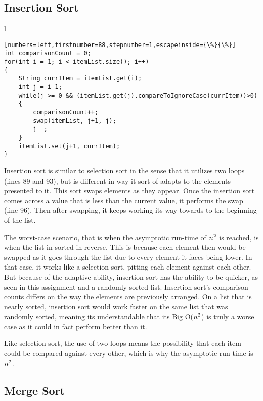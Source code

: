 \documentclass[letterpaper, 10pt,DIV=13]{scrartcl}
\numberwithin{equation}{section} %
\numberwithin{figure}{section} %
\numberwithin{table}{section} %
\begin{document}
\subsection{Insertion Sort}
\begin{center}
\begin{tabular}{l}
\begin{lstlisting}[numbers=left,firstnumber=88,stepnumber=1,escapeinside={\%}{\%}]
int comparisonCount = 0;
for(int i = 1; i < itemList.size(); i++)
{
    String currItem = itemList.get(i);
    int j = i-1;
    while(j >= 0 && (itemList.get(j).compareToIgnoreCase(currItem))>0)
    {
        comparisonCount++;
        swap(itemList, j+1, j);
        j--;
    }
    itemList.set(j+1, currItem);
}
\end{lstlisting}
\end{tabular}
\end{center}\textbf{}
        
Insertion sort is similar to selection sort in the sense that it utilizes two loops (lines 89 and 93),  but is different in way it sort of adapts to the elements presented to it.  This sort swaps elements as they appear.  Once the insertion sort comes across a value that is less than the current value, it performs the swap (line 96).  Then after swapping, it keeps working its way towards to the beginning of the list.  

The worst-case scenario, that is when the asymptotic run-time of $n\textsuperscript{2}$ is reached, is when the list in sorted in reverse.  This is because each element then would be swapped as it goes through the list due to every element it faces being lower.  In that case, it works like a selection sort, pitting each element against each other.  But because of the adaptive ability, insertion sort has the ability to be quicker, as seen in this assignment and a randomly sorted list.  Insertion sort's comparison counts differs on the way the elements are previously arranged.  On a list that is nearly sorted, insertion sort would work faster on the same list that was randomly sorted, meaning its understandable that its Big O($n\textsuperscript{2}$) is truly a worse case as it could in fact perform better than it.  

Like selection sort, the use of two loops means the possibility that each item could be compared against every other, which is why the asymptotic run-time is $n\textsuperscript{2}$.    
        
\subsection{Merge Sort}
\end{document}
